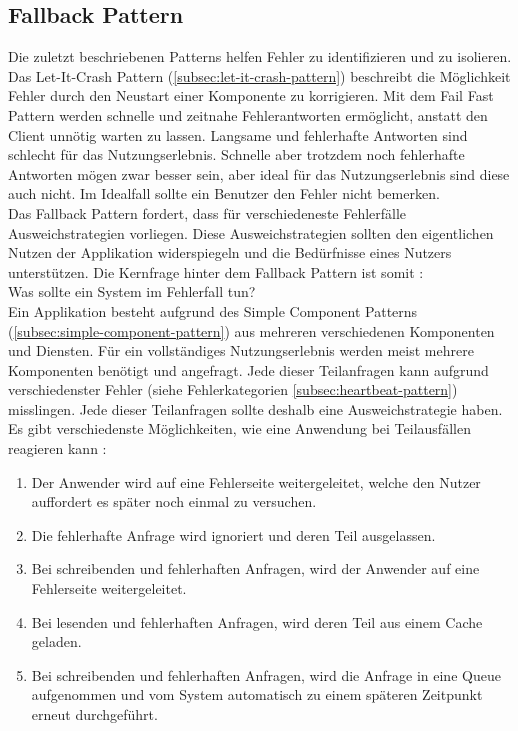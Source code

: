 \subsection{Fallback Pattern}\label{subsec:fallback-pattern}
Die zuletzt beschriebenen Patterns helfen Fehler zu identifizieren und zu isolieren. Das Let-It-Crash Pattern (\ref{subsec:let-it-crash-pattern}) beschreibt die Möglichkeit Fehler durch den Neustart einer Komponente zu korrigieren. Mit dem Fail Fast Pattern werden schnelle und zeitnahe Fehlerantworten ermöglicht, anstatt den Client unnötig warten zu lassen. Langsame und fehlerhafte Antworten sind schlecht für das Nutzungserlebnis. Schnelle aber trotzdem noch fehlerhafte Antworten mögen zwar besser sein, aber ideal für das Nutzungserlebnis sind diese auch nicht. Im Idealfall sollte ein Benutzer den Fehler nicht bemerken.\\
Das Fallback Pattern fordert, dass für verschiedeneste Fehlerfälle Ausweichstrategien vorliegen. Diese Ausweichstrategien sollten den eigentlichen Nutzen der Applikation widerspiegeln und die Bedürfnisse eines Nutzers unterstützen. Die Kernfrage hinter dem Fallback Pattern ist somit \cite{friedrichsen_unkaputtbar_2014}:\\
Was sollte ein System im Fehlerfall tun?\\
Ein Applikation besteht aufgrund des Simple Component Patterns (\ref{subsec:simple-component-pattern}) aus mehreren verschiedenen Komponenten und Diensten. Für ein vollständiges Nutzungserlebnis werden meist mehrere Komponenten benötigt und angefragt. Jede dieser Teilanfragen kann aufgrund verschiedenster Fehler (siehe Fehlerkategorien \ref{subsec:heartbeat-pattern}) misslingen. Jede dieser Teilanfragen sollte deshalb eine Ausweichstrategie haben. Es gibt verschiedenste Möglichkeiten, wie eine Anwendung bei Teilausfällen reagieren kann \cite{friedrichsen_unkaputtbar_2014}:

\begin{enumerate}
\item Der Anwender wird auf eine Fehlerseite weitergeleitet, welche den Nutzer auffordert es später noch einmal zu versuchen.
\item Die fehlerhafte Anfrage wird ignoriert und deren Teil ausgelassen.
\item Bei schreibenden und fehlerhaften Anfragen, wird der Anwender auf eine Fehlerseite weitergeleitet.
\item Bei lesenden und fehlerhaften Anfragen, wird deren Teil aus einem Cache geladen.
\item Bei schreibenden und fehlerhaften Anfragen, wird die Anfrage in eine Queue aufgenommen und vom System automatisch zu einem späteren Zeitpunkt erneut durchgeführt.
\end{enumerate}

